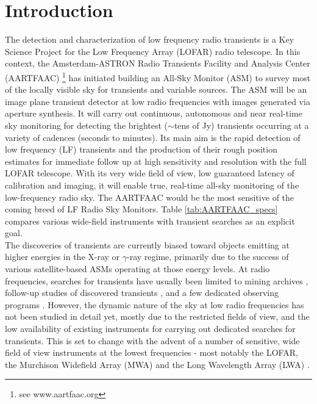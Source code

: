 \documentclass{aa}
\begin{document}
\section{\label{sec:Introduction}Introduction}
The detection  and characterization of low  frequency radio transients  is a Key
Science  Project \citep{fender2006lofar}  for  the Low  Frequency Array  (LOFAR)
\citep{vanhaarlem2013lofar}   radio    telescope.    In   this    context,   the
Amsterdam-ASTRON    Radio    Transients    Facility    and    Analysis    Center
(AARTFAAC) \footnote{see  www.aartfaac.org }  has initiated building  an All-Sky
Monitor  (ASM) to  survey most  of the  locally visible  sky for  transients and
variable sources.   The ASM  will be  an image plane  transient detector  at low
radio frequencies with  images generated via aperture synthesis.   It will carry
out continuous, autonomous  and near real-time sky monitoring  for detecting the
brightest  ($\sim$tens of  Jy) transients  occurring  at a  variety of  cadences
(seconds to minutes). Its main aim  is the rapid detection of low frequency (LF)
transients and  the production of  their rough position estimates  for immediate
follow up at high sensitivity and resolution with the full LOFAR telescope. With
its very wide field of view,  low guaranteed latency of calibration and imaging,
it will  enable true,  real-time all-sky monitoring  of the  low-frequency radio
sky. The AARTFAAC  would be the most  sensitive of the coming breed  of LF Radio
Sky  Monitors.   Table   \ref{tab:AARTFAAC_specs}  compares  various  wide-field
instruments with transient searches as an explicit goal.\\

The discoveries of  transients are currently biased toward  objects emitting at
higher  energies in  the X-ray  or $\gamma$-ray  regime, primarily  due  to the
success of  various satellite-based ASMs operating  at those energy  levels. At
radio frequencies, searches  for transients have usually been  limited to mining
archives \citep{bower2007submillijansky,  bower2011search}, follow-up studies of
discovered  transients \citep{chandra2012radio}, and  a few  dedicated observing
programs  \citep{bannister2012limits,  katz2003survey}.   However,  the  dynamic
nature of the sky  at low radio frequencies has not been  studied in detail yet,
mostly  due to  the  restricted fields  of  view, and  the  low availability  of
existing instruments  for carrying out dedicated searches  for transients.  This
is set to  change with the advent of  a number of sensitive, wide  field of view
instruments at  the lowest  frequencies - most notably  the LOFAR,  the Murchison
Widefield  Array  (MWA) \citep{lonsdale2009murchison}  and  the Long  Wavelength
Array (LWA) \citep{ellingson2009long}.
\end{document}
